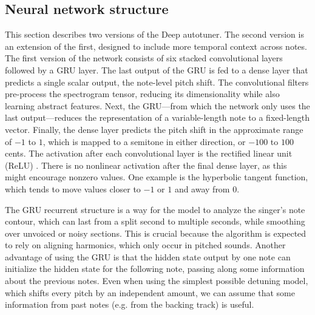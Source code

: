 \subsection{Neural network structure}
This section describes two versions of the Deep autotuner. The second version is an extension of the first, designed to include more temporal context across notes. The first version of the network consists of six stacked convolutional layers followed by a GRU layer. The last output of the GRU is fed to a dense layer that predicts a single scalar output, the note-level pitch shift. The convolutional filters pre-process the spectrogram tensor, reducing its dimensionality while also learning abstract features. Next, the GRU---from which the network only uses the last output---reduces the representation of a variable-length note to a fixed-length vector. Finally, the dense layer predicts the pitch shift in the approximate range of $-1$ to $1$, which is mapped to a semitone in either direction, or $-100$ to $100$ cents. The activation after each convolutional layer is the rectified linear unit (ReLU) \cite{he2015delving}. There is no nonlinear activation after the final dense layer, as this might encourage nonzero values. One example is the hyperbolic tangent function, which tends to move values closer to $-1$ or $1$ and away from 0. 

The GRU recurrent structure is a way for the model to analyze the singer's note contour, which can last from a split second to multiple seconds, while smoothing over unvoiced or noisy sections. This is crucial because the algorithm is expected to rely on aligning harmonics, which only occur in pitched sounds. Another advantage of using the GRU is that the hidden state output by one note can initialize the hidden state for the following note, passing along some information about the previous notes. Even when using the simplest possible detuning model, which shifts every pitch by an independent amount, we can assume that some information from past notes (e.g. from the backing track) is useful.

